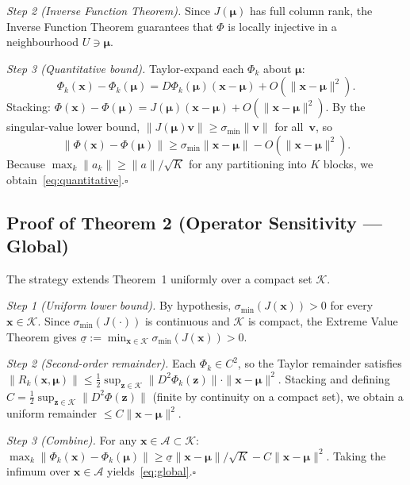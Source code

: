\documentclass[journal]{IEEEtran}
\begin{document}
\textit{Step 2 (Inverse Function Theorem).}
Since $J(\boldsymbol{\mu})$ has full column rank, the Inverse Function Theorem guarantees that $\Phi$ is locally injective in a neighbourhood $U\ni\boldsymbol{\mu}$.

\textit{Step 3 (Quantitative bound).}
Taylor-expand each $\Phi_k$ about $\boldsymbol{\mu}$:
\[
\Phi_k(\mathbf{x}) - \Phi_k(\boldsymbol{\mu}) = D\Phi_k(\boldsymbol{\mu})(\mathbf{x}-\boldsymbol{\mu}) + O(\|\mathbf{x}-\boldsymbol{\mu}\|^2).
\]
Stacking: $\Phi(\mathbf{x})-\Phi(\boldsymbol{\mu}) = J(\boldsymbol{\mu})(\mathbf{x}-\boldsymbol{\mu}) + O(\|\mathbf{x}-\boldsymbol{\mu}\|^2)$.
By the singular-value lower bound, $\|J(\boldsymbol{\mu})\mathbf{v}\|\geq\sigma_{\min}\|\mathbf{v}\|$ for all~$\mathbf{v}$, so
\[
\|\Phi(\mathbf{x})-\Phi(\boldsymbol{\mu})\| \geq \sigma_{\min}\|\mathbf{x}-\boldsymbol{\mu}\| - O(\|\mathbf{x}-\boldsymbol{\mu}\|^2).
\]
Because $\max_k\|a_k\|\geq\|a\|/\sqrt{K}$ for any partitioning into $K$ blocks, we obtain~\eqref{eq:quantitative}.\hfill$\square$

\subsection{Proof of Theorem 2 (Operator Sensitivity --- Global)}

The strategy extends Theorem~1 uniformly over a compact set $\mathcal{K}$.

\textit{Step 1 (Uniform lower bound).}
By hypothesis, $\sigma_{\min}(J(\mathbf{x}))>0$ for every $\mathbf{x}\in\mathcal{K}$.
Since $\sigma_{\min}(J(\cdot))$ is continuous and $\mathcal{K}$ is compact, the Extreme Value Theorem gives $\underline{\sigma}:=\min_{\mathbf{x}\in\mathcal{K}}\sigma_{\min}(J(\mathbf{x}))>0$.

\textit{Step 2 (Second-order remainder).}
Each $\Phi_k\in C^2$, so the Taylor remainder satisfies $\|R_k(\mathbf{x},\boldsymbol{\mu})\|\leq\frac{1}{2}\sup_{\mathbf{z}\in\mathcal{K}}\|D^2\Phi_k(\mathbf{z})\|\cdot\|\mathbf{x}-\boldsymbol{\mu}\|^2$.  Stacking and defining $C=\frac{1}{2}\sup_{\mathbf{z}\in\mathcal{K}}\|D^2\Phi(\mathbf{z})\|$ (finite by continuity on a compact set), we obtain a uniform remainder $\leq C\|\mathbf{x}-\boldsymbol{\mu}\|^2$.

\textit{Step 3 (Combine).}
For any $\mathbf{x}\in\mathcal{A}\subset\mathcal{K}$:
$\max_k\|\Phi_k(\mathbf{x})-\Phi_k(\boldsymbol{\mu})\|\geq\underline{\sigma}\|\mathbf{x}-\boldsymbol{\mu}\|/\sqrt{K} - C\|\mathbf{x}-\boldsymbol{\mu}\|^2$.
Taking the infimum over $\mathbf{x}\in\mathcal{A}$ yields~\eqref{eq:global}.\hfill$\square$
\end{document}
